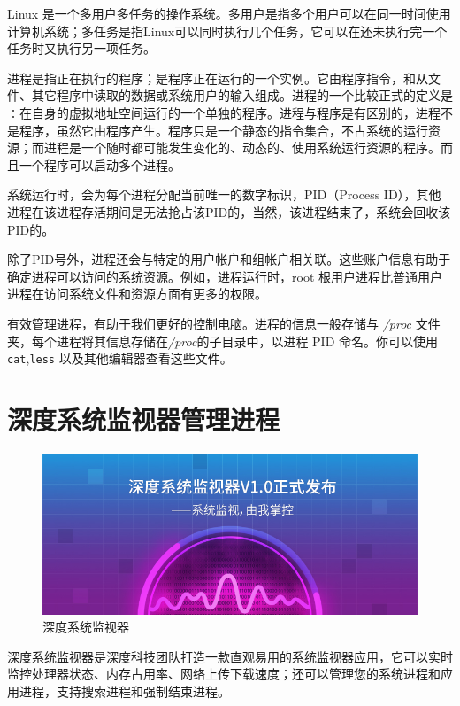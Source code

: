 \documentclass[doctor,openright,twoside]{sjtuthesis}
\newcommand{\passthrough}[1]{#1}
\theoremstyle{plain}
\theoremstyle{definition}
\theoremstyle{remark}
\theoremstyle{ocrenumbox}
\theoremstyle{plain}
\begin{document}
Linux
是一个多用户多任务的操作系统。多用户是指多个用户可以在同一时间使用计算机系统；多任务是指Linux可以同时执行几个任务，它可以在还未执行完一个任务时又执行另一项任务。

进程是指正在执行的程序；是程序正在运行的一个实例。它由程序指令，和从文件、其它程序中读取的数据或系统用户的输入组成。进程的一个比较正式的定义是∶在自身的虚拟地址空间运行的一个单独的程序。进程与程序是有区别的，进程不是程序，虽然它由程序产生。程序只是一个静态的指令集合，不占系统的运行资源；而进程是一个随时都可能发生变化的、动态的、使用系统运行资源的程序。而且一个程序可以启动多个进程。

系统运行时，会为每个进程分配当前唯一的数字标识，PID（Process
ID），其他进程在该进程存活期间是无法抢占该PID的，当然，该进程结束了，系统会回收该PID的。

除了PID号外，进程还会与特定的用户帐户和组帐户相关联。这些账户信息有助于确定进程可以访问的系统资源。例如，进程运行时，root
根用户进程比普通用户进程在访问系统文件和资源方面有更多的权限。

有效管理进程，有助于我们更好的控制电脑。进程的信息一般存储与
\emph{/proc}
文件夹，每个进程将其信息存储在\emph{/proc}的子目录中，以进程 PID
命名。你可以使用
\passthrough{\lstinline!cat!},\passthrough{\lstinline!less!}
以及其他编辑器查看这些文件。

\section{深度系统监视器管理进程}

\begin{figure}
\centering
\includegraphics{images/deepin-system-monitor-1.jpg}
\caption{深度系统监视器}
\end{figure}

深度系统监视器是深度科技团队打造一款直观易用的系统监视器应用，它可以实时监控处理器状态、内存占用率、网络上传下载速度；还可以管理您的系统进程和应用进程，支持搜索进程和强制结束进程。
\end{document}
